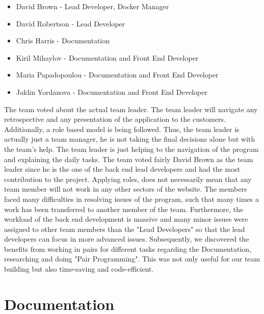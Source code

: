 \documentclass{l3proj}
\begin{document}
\begin{itemize}

\item David Brown - Lead Developer, Docker Manager

\item David Robertson - Lead Developer

\item Chris Harris - Documentation

\item Kiril Mihaylov - Documentation and Front End Developer

\item Maria Papadopoulou - Documentation and Front End Developer

\item Jaklin Yordanova - Documentation and Front End Developer

\end{itemize}
The team voted about the actual team leader. The team leader will navigate any retrospective and any presentation of the application to the customers. Additionally, a role based model is being followed. Thus, the team leader is actually just a team manager, he is not taking the final decisions alone but with the team's help. The team leader is just helping to the navigation of the program and explaining the daily tasks. The team voted fairly David Brown as the team leader since he is the one of the back end lead developers and had the most contribution to the project. Applying roles, does not necessarily mean that any team member will not work in any other sectors of the website. The members faced many difficulties in resolving issues of the program, such that many times a work has been transferred to another member of the team. Furthermore, the workload of the back end development is massive and many minor issues were assigned to other team members than the "Lead Developers" so that the lead developers can focus in more advanced issues. Subsequently, we discovered the benefits from working in pairs for different tasks regarding the Documentation, researching and doing "Pair Programming". This was not only useful for our team building but also time-saving and code-efficient.


\section{Documentation}
\label{documentation}
\end{document}
